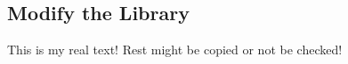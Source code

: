 \subsection{Modify the Library} \label{subsection:evaluation-modifications-library}
This is my real text! Rest might be copied or not be checked!
